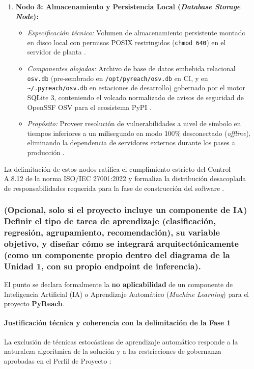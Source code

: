 \begin{enumerate}
    \item \textbf{Nodo 3: Almacenamiento y Persistencia Local (\textit{Database Storage Node}):}
    \begin{itemize}
        \item \textit{Especificación técnica:} Volumen de almacenamiento persistente montado en disco local con permisos POSIX restringidos (\texttt{chmod 640}) en el servidor de planta \cite{gutierrez2024auditoria}.
        \item \textit{Componentes alojados:} Archivo de base de datos embebida relacional \texttt{osv.\allowbreak db} (pre-sembrado en \texttt{/\allowbreak opt/\allowbreak pyreach/\allowbreak osv.\allowbreak db} en CI, y en \texttt{\textasciitilde/\allowbreak .\allowbreak pyreach/\allowbreak osv.\allowbreak db} en estaciones de desarrollo) gobernado por el motor SQLite 3, conteniendo el volcado normalizado de avisos de seguridad de OpenSSF OSV para el ecosistema PyPI \cite{openssf2023osv}.
        \item \textit{Propósito:} Proveer resolución de vulnerabilidades a nivel de símbolo en tiempos inferiores a un milisegundo en modo 100\% desconectado (\textit{offline}), eliminando la dependencia de servidores externos durante los pases a producción \cite{torres2026proyecto}.
    \end{itemize}
\end{enumerate}

La delimitación de estos nodos ratifica el cumplimiento estricto del Control A.8.12 de la norma ISO/IEC 27001:2022 y formaliza la distribución desacoplada de responsabilidades requerida para la fase de construcción del software \cite{gutierrez2024auditoria, martin2017cleanarch}.

\subsubsection{(Opcional, solo si el proyecto incluye un componente de IA) Definir el tipo de tarea de aprendizaje (clasificación, regresión, agrupamiento, recomendación), su variable objetivo, y diseñar cómo se integrará arquitectónicamente (como un componente propio dentro del diagrama de la Unidad 1, con su propio endpoint de inferencia).}

El punto se declara formalmente la \textbf{no aplicabilidad} de un componente de Inteligencia Artificial (IA) o Aprendizaje Automático (\textit{Machine Learning}) para el proyecto \textbf{PyReach}.

\paragraph*{Justificación técnica y coherencia con la delimitación de la Fase 1}
La exclusión de técnicas estocásticas de aprendizaje automático responde a la naturaleza algorítmica de la solución y a las restricciones de gobernanza aprobadas en el Perfil de Proyecto \cite{torres2026proyecto}:

